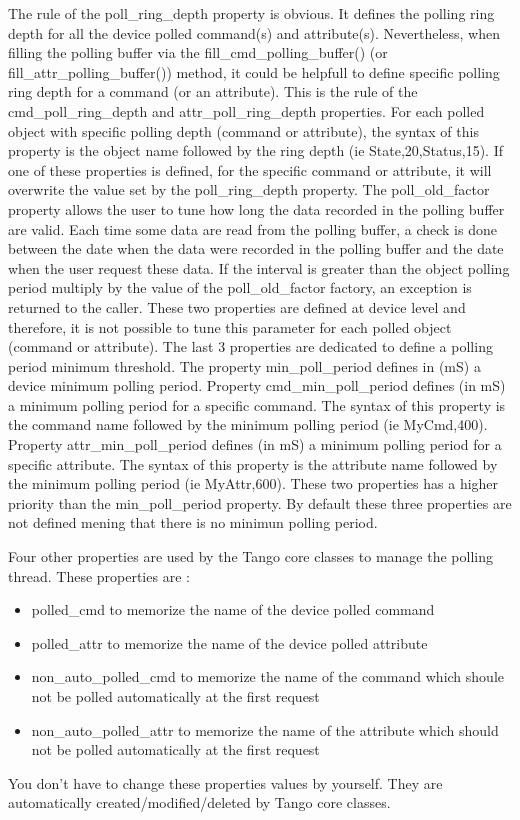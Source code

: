 The rule of the poll\_ring\_depth property
is obvious. It defines the polling ring depth for all the device polled
command(s) and attribute(s). Nevertheless, when filling the polling
buffer via the fill\_cmd\_polling\_buffer()
(or fill\_attr\_polling\_buffer())
method, it could be helpfull to define specific polling ring depth
for a command (or an attribute). This is the rule of the cmd\_poll\_ring\_depth
and attr\_poll\_ring\_depth properties.
For each polled object with specific polling depth (command or attribute),
the syntax of this property is the object name followed by the ring
depth (ie State,20,Status,15). If one of these properties is defined,
for the specific command or attribute, it will overwrite the value
set by the poll\_ring\_depth property. The poll\_old\_factor
property allows the user to tune how long the data recorded in the
polling buffer are valid. Each time some data are read from the polling
buffer, a check is done between the date when the data were recorded
in the polling buffer and the date when the user request these data.
If the interval is greater than the object polling period multiply
by the value of the poll\_old\_factor factory, an exception is returned
to the caller. These two properties are defined at device level and
therefore, it is not possible to tune this parameter for each polled
object (command or attribute). The last 3 properties are dedicated
to define a polling period minimum threshold. The property min\_poll\_period
defines in (mS) a device minimum polling period. Property cmd\_min\_poll\_period
defines (in mS) a minimum polling period for a specific command. The
syntax of this property is the command name followed by the minimum
polling period (ie MyCmd,400). Property attr\_min\_poll\_period
defines (in mS) a minimum polling period for a specific attribute.
The syntax of this property is the attribute name followed by the
minimum polling period (ie MyAttr,600). These two properties has a
higher priority than the min\_poll\_period property. By default these
three properties are not defined mening that there is no minimun polling
period.

Four other properties are used by the Tango core classes to manage
the polling thread. These properties are :
\begin{itemize}
\item polled\_cmd to memorize the name of the device polled command
\item polled\_attr to memorize the name of the device polled attribute
\item non\_auto\_polled\_cmd to memorize the name of the command which shoule
not be polled automatically at the first request
\item non\_auto\_polled\_attr to memorize the name of the attribute which
should not be polled automatically at the first request
\end{itemize}
You don't have to change these properties values by yourself. They
are automatically created/modified/deleted by Tango core classes.

